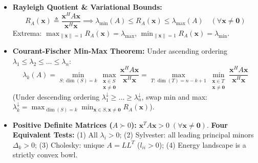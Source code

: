 \begin{tcolorbox}[breakable, colback=tealbg!30, colframe=tealborder, title={\large \textbf{2. Spectral Theory, Complex Operators \& Rayleigh Quotient (Weeks 4--5)}}]
\begin{itemize}[leftmargin=*, noitemsep, topsep=2pt]
\begin{equation*}
    \end{equation*}
    \item \textbf{Rayleigh Quotient \& Variational Bounds:}
    \begin{equation*}
    R_A(\mathbf{x}) \triangleq \frac{\mathbf{x}^H A \mathbf{x}}{\mathbf{x}^H \mathbf{x}} \implies \lambda_{\min}(A) \le R_A(\mathbf{x}) \le \lambda_{\max}(A) \quad (\forall \mathbf{x} \ne \mathbf{0})
    \end{equation*}
    Extrema: $\max_{\|\mathbf{x}\|=1} R_A(\mathbf{x}) = \lambda_{\max}$, $\min_{\|\mathbf{x}\|=1} R_A(\mathbf{x}) = \lambda_{\min}$.
    \item \textbf{Courant-Fischer Min-Max Theorem:} Under ascending ordering $\lambda_1 \le \lambda_2 \le \dots \le \lambda_n$:
    \begin{equation*}
    \lambda_k(A) = \min_{S: \dim(S) = k} \max_{\substack{\mathbf{x} \in S \\ \mathbf{x} \ne \mathbf{0}}} \frac{\mathbf{x}^H A \mathbf{x}}{\mathbf{x}^H \mathbf{x}} = \max_{T: \dim(T) = n - k + 1} \min_{\substack{\mathbf{x} \in T \\ \mathbf{x} \ne \mathbf{0}}} \frac{\mathbf{x}^H A \mathbf{x}}{\mathbf{x}^H \mathbf{x}}
    \end{equation*}
    (Under descending ordering $\lambda_1^\downarrow \ge \dots \ge \lambda_n^\downarrow$, swap min and max: $\lambda_k^\downarrow = \max_{\dim(S)=k} \min_{\mathbf{x} \in S, \mathbf{x} \ne \mathbf{0}} R_A(\mathbf{x})$).
    \item \textbf{Positive Definite Matrices ($A \succ 0$):} $\mathbf{x}^T A \mathbf{x} > 0 \; (\forall \mathbf{x} \ne \mathbf{0})$.
    \textbf{Four Equivalent Tests:} (1) All $\lambda_i > 0$; (2) Sylvester: all leading principal minors $\Delta_k > 0$; (3) Cholesky: unique $A = L L^T$ ($l_{ii} > 0$); (4) Energy landscape is a strictly convex bowl.
\end{itemize}
\end{tcolorbox}

